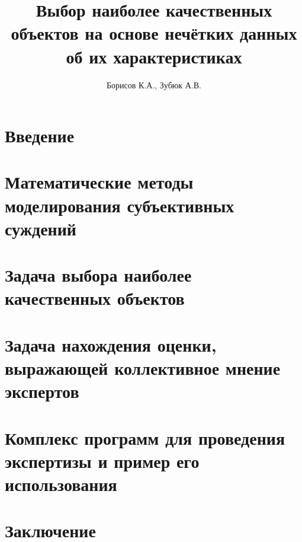 \documentclass[14pt]{extarticle}
\begin{document}

\thispagestyle{empty}			

\title{Выбор наиболее качественных объектов на основе нечётких данных об их характеристиках } 
\author{Борисов К.А., Зубюк А.В.}
\maketitle

\tableofcontents
\clearpage

\section{Введение} 

\clearpage

\section{Математические методы моделирования субъективных суждений}

\clearpage

\section{Задача выбора наиболее качественных объектов}
 
\clearpage
\section{Задача нахождения оценки, выражающей коллективное мнение экспертов}

\clearpage

\section{Комплекс программ для проведения экспертизы и пример его использования }

\clearpage

\section{Заключение}
 
\clearpage
\printbibliography[heading=bibintoc]
\end{document}
